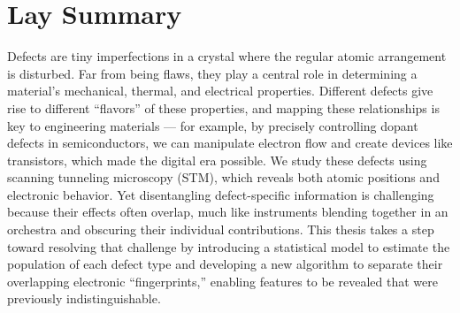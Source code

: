 

\chapter{Lay Summary}

Defects are tiny imperfections in a crystal where the regular atomic arrangement is disturbed. Far from being flaws, they play a central role in determining a material’s mechanical, thermal, and electrical properties. Different defects give rise to different “flavors” of these properties, and mapping these relationships is key to engineering materials — for example, by precisely controlling dopant defects in semiconductors, we can manipulate electron flow and create devices like transistors, which made the digital era possible. We study these defects using scanning tunneling microscopy (STM), which reveals both atomic positions and electronic behavior. Yet disentangling defect-specific information is challenging because their effects often overlap, much like instruments blending together in an orchestra and obscuring their individual contributions. This thesis takes a step toward resolving that challenge by introducing a statistical model to estimate the population of each defect type and developing a new algorithm to separate their overlapping electronic “fingerprints,” enabling features to be revealed that were previously indistinguishable.
